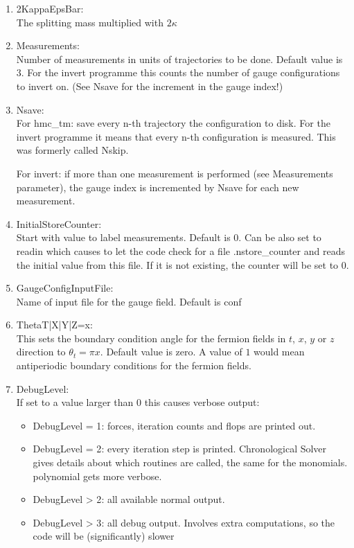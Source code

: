 \begin{enumerate}
\item {\ttfamily 2KappaEpsBar}:\\
  The splitting mass multiplied with $2\kappa$

\item {\ttfamily Measurements}:\\
  Number of measurements in units of trajectories to be done. Default
  value is $3$. For the {\ttfamily invert} programme this counts the
  number of gauge configurations to invert on. (See {\ttfamily Nsave}
  for the increment in the gauge index!)

\item {\ttfamily Nsave}:\\
  For {\ttfamily hmc\_tm}: save every n-th trajectory the
  configuration to disk. 
  For the {\ttfamily invert} programme it means that every n-th
  configuration is measured. This was formerly called {\ttfamily
    Nskip}.
  
  For {\ttfamily invert}: if more than one measurement is performed
  (see {\ttfamily Measurements} parameter),
  the gauge index is incremented by {\ttfamily Nsave} for each new
  measurement. 

\item {\ttfamily InitialStoreCounter}:\\
  Start with value to label measurements. Default is $0$. Can be also
  set to {\ttfamily readin} which causes to let the code check for a
  file {\ttfamily .nstore\_counter} and reads the initial value from
  this file. If it is not existing, the counter will be set to $0$.

\item {\ttfamily GaugeConfigInputFile}:\\
  Name of input file for the gauge field. Default is {\ttfamily conf}

\item {\ttfamily ThetaT|X|Y|Z=x}:\\
  This sets the boundary condition angle for the fermion fields in
  $t$, $x$, $y$ or $z$ direction to $\theta_t = \pi x$. Default value is
  zero. A value of $1$ would mean antiperiodic boundary conditions
  for the fermion fields.

\item {\ttfamily DebugLevel}:\\
  If set to a value larger than $0$ this causes verbose output:
  \begin{itemize}
  \item {\ttfamily DebugLevel = 1}: forces, iteration counts and flops are printed out.
  \item {\ttfamily DebugLevel = 2}: every iteration step is
    printed. Chronological Solver gives details about which routines
    are called, the same for the monomials. polynomial gets more verbose.
  \item {\ttfamily DebugLevel > 2}: all available normal output.
  \item {\ttfamily DebugLevel > 3}: all debug output. Involves extra
    computations, so the code will be (significantly) slower
  \end{itemize}


\end{enumerate}

